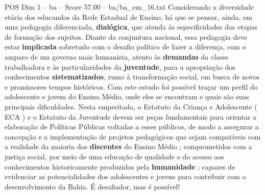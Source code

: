 \begin{textsample}{POS Dim 1 – ba – Score 57.00 – ba/ba\_em\_16.txt}
Considerando a diversidade etária dos educandos da Rede Estadual de Ensino, há que se pensar, ainda, em uma pedagogia diferenciada, \textbf{dialógica}, que atenda às especificidades das etapas de formação dos sujeitos.
Diante da conjuntura nacional, essa pedagogia deve estar \textbf{implicada} sobretudo com o desafio político de fazer a diferença, com o amparo de um governo mais humanista, atento às \textbf{demandas} da classe trabalhadora e às particularidades da \textbf{juventude}, para a apropriação dos conhecimentos \textbf{sistematizados}, rumo à transformação social, em busca de novos e promissores tempos históricos.
Com este estudo foi possível traçar um perfil do adolescente e jovem do Ensino Médio, onde eles se encontram e quais são suas principais dificuldades.
Nesta empreitada, o Estatuto da Criança e Adolescente ( ECA ) e o Estatuto da Juventude devem ser peças fundamentais para orientar a elaboração de Políticas Públicas voltadas a esses públicos, de modo a assegurar a concepção e a implementação de projetos pedagógicos que sejam compatíveis com a realidade da maioria dos \textbf{discentes} do Ensino Médio ; comprometidos com a justiça social, por meio de uma educação de qualidade e do acesso aos conhecimentos historicamente produzidos pela \textbf{humanidade} ; capazes de evidenciar as potencialidades dos adolescentes e jovens para contribuir com o desenvolvimento da Bahia.
É desafiador, mas é possível!

\end{textsample}
